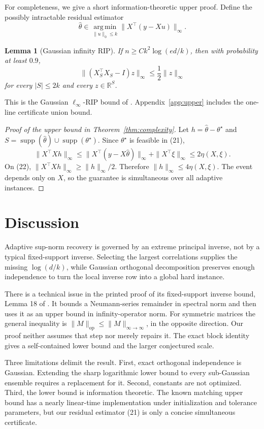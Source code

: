 \documentclass[twoside]{article}
\newtheorem{lemma}[theorem]{Lemma}
\newcommand{\R}{\mathbb R}
\newcommand{\supp}{\operatorname{supp}}
\newcommand{\argmin}{\operatorname*{arg\,min}}
\begin{document}
For completeness, we give a short information-theoretic upper proof. Define the possibly intractable residual estimator \[ \widehat\theta\in \argmin_{\|u\|_0\leq k}\|X^\top(y-Xu)\|_\infty. \tag{21} \]

\begin{lemma}[Gaussian infinity RIP]
\label{lem:infrip}
If $n\geq Ck^2\log(ed/k)$, then with probability at least $0.9$, \[ \|(X_S^\top X_S-I)z\|_\infty\leq\frac12\|z\|_\infty \tag{22} \] for every $|S|\leq2k$ and every $z\in\R^S$.
\end{lemma}

This is the Gaussian $\ell_\infty$-RIP bound of \citet{chen2026adaptive}. Appendix~\ref{app:upper} includes the one-line certificate union bound.

\begin{proof}[Proof of the upper bound in Theorem~\ref{thm:complexity}]
Let $h=\widehat\theta-\theta^\star$ and $S=\supp(\widehat\theta)\cup\supp(\theta^\star)$. Since $\theta^\star$ is feasible in (21), \[ \|X^\top Xh\|_\infty \leq\|X^\top(y-X\widehat\theta)\|_\infty +\|X^\top\xi\|_\infty \leq2\eta(X,\xi). \] On (22), $\|X^\top Xh\|_\infty\geq\|h\|_\infty/2$. Therefore $\|h\|_\infty\leq4\eta(X,\xi)$. The event depends only on $X$, so the guarantee is simultaneous over all adaptive instances.
\end{proof}

\section{Discussion}
\label{sec:discussion}

Adaptive sup-norm recovery is governed by an extreme principal inverse, not by a typical fixed-support inverse. Selecting the largest correlations supplies the missing $\log(d/k)$, while Gaussian orthogonal decomposition preserves enough independence to turn the local inverse row into a global hard instance.

There is a technical issue in the printed proof of its fixed-support inverse bound, Lemma 18 of \citet{chen2026adaptive}. It bounds a Neumann-series remainder in spectral norm and then uses it as an upper bound in infinity-operator norm. For symmetric matrices the general inequality is $\|M\|_{\mathrm{op}}\leq\|M\|_{\infty\to\infty}$, in the opposite direction. Our proof neither assumes that step nor merely repairs it. The exact block identity gives a self-contained lower bound and the larger conjectured scale.

Three limitations delimit the result. First, exact orthogonal independence is Gaussian. Extending the sharp logarithmic lower bound to every sub-Gaussian ensemble requires a replacement for it. Second, constants are not optimized. Third, the lower bound is information theoretic. The known matching upper bound has a nearly linear-time implementation under initialization and tolerance parameters, but our residual estimator (21) is only a concise simultaneous certificate.
\end{document}
